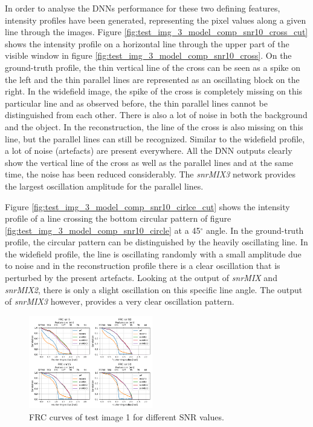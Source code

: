 \documentclass[conference]{IEEEtran}
\begin{document}
In order to analyse the DNNs performance for these two defining features, intensity profiles have been generated, representing the pixel values along a given line through the images. Figure \ref{fig:test_img_3_model_comp_snr10_cross_cut} shows the intensity profile on a horizontal line through the upper part of the visible window in figure \ref{fig:test_img_3_model_comp_snr10_cross}. On the ground-truth profile, the thin vertical line of the cross can be seen as a spike on the left and the thin parallel lines are represented as an oscillating block on the right. In the widefield image, the spike of the cross is completely missing on this particular line and as observed before, the thin parallel lines cannot be distinguished from each other. There is also a lot of noise in both the background and the object. In the reconstruction, the line of the cross is also missing on this line, but the parallel lines can still be recognized. Similar to the widefield profile, a lot of noise (artefacts) are present everywhere. All the DNN outputs clearly show the vertical line of the cross as well as the parallel lines and at the same time, the noise has been reduced considerably. The \textit{snrMIX3} network provides the largest oscillation amplitude for the parallel lines.

Figure \ref{fig:test_img_3_model_comp_snr10_cirlce_cut} shows the intensity profile of a line crossing the bottom circular pattern of figure \ref{fig:test_img_3_model_comp_snr10_circle} at a 45$^\circ$ angle. In the ground-truth profile, the circular pattern can be distinguished by the heavily oscillating line. In the widefield profile, the line is oscillating randomly with a small amplitude due to noise and in the reconstruction profile there is a clear oscillation that is perturbed by the present artefacts. Looking at the output of \textit{snrMIX} and \textit{snrMIX2}, there is only a slight oscillation on this specific line angle. The output of \textit{snrMIX3} however, provides a very clear oscillation pattern.

\begin{figure}[h]
    \centering
    \includegraphics[width=0.48\textwidth]{images/test_img_4_comp_frc.png}
    \caption{FRC curves of test image 1 for different SNR values.}
    \label{fig:test_img_4_comp_frc}
\end{figure}
\end{document}
